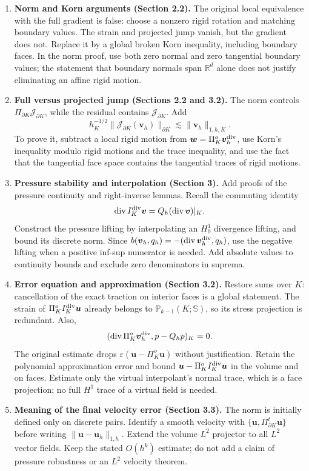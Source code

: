 \documentclass[10pt]{article}
\newcommand{\eps}{\varepsilon}
\begin{document}
\begin{enumerate}
\item \textbf{Norm and Korn arguments (Section 2.2).}
The original local equivalence with the full gradient is false: choose a
nonzero rigid rotation and matching boundary values. The strain and projected
jump vanish, but the gradient does not. Replace it by a global broken Korn
inequality, including boundary faces. In the norm proof, use both zero normal
and zero tangential boundary values; the statement that boundary normals span
$\mathbb R^d$ alone does not justify eliminating an affine rigid motion.

\item \textbf{Full versus projected jump (Sections 2.2 and 3.2).}
The norm controls $\Pi_{\partial K}\mathcal J_{\partial K}$, while the residual
contains $\mathcal J_{\partial K}$. Add
\[
h_K^{-1/2}\|\mathcal J_{\partial K}(\boldsymbol v_h)\|_{\partial K}
\lesssim\|\boldsymbol v_h\|_{1,h,K}.
\]
To prove it, subtract a local rigid motion from
$\boldsymbol w=\Pi_K^o\boldsymbol v_h^{\rm div}$, use Korn's inequality modulo
rigid motions and the trace inequality, and use the fact that the tangential
face space contains the tangential traces of rigid motions.

\item \textbf{Pressure stability and interpolation (Section 3).}
Add proofs of the pressure continuity and right-inverse lemmas. Recall the
commuting identity
\[
\operatorname{div}I_K^{\rm div}\boldsymbol v
=Q_h(\operatorname{div}\boldsymbol v)|_K.
\]
Construct the pressure lifting by interpolating an $H_0^1$ divergence lifting,
and bound its discrete norm. Since $b(\boldsymbol v_h,q_h)=
-(\operatorname{div}\boldsymbol v_h^{\rm div},q_h)$, use the negative lifting
when a positive inf-sup numerator is needed. Add absolute values to continuity
bounds and exclude zero denominators in suprema.

\item \textbf{Error equation and approximation (Section 3.2).}
Restore sums over $K$: cancellation of the exact traction on interior faces is
a global statement. The strain of $\Pi_K^o I_K^{\rm div}\boldsymbol u$ already
belongs to $\mathbb P_{k-1}(K;\mathbb S)$, so its stress projection is redundant.
Also,
\[
(\operatorname{div}\Pi_K^o\boldsymbol v_h^{\rm div},p-Q_hp)_K=0.
\]
The original estimate drops $\eps(\boldsymbol u-\Pi_K^o\boldsymbol u)$ without
justification. Retain the polynomial approximation error and bound
$\boldsymbol u-\Pi_K^o I_K^{\rm div}\boldsymbol u$ in the volume and on faces.
Estimate only the virtual interpolant's normal trace, which is a face
projection; no full $H^1$ trace of a virtual field is needed.

\item \textbf{Meaning of the final velocity error (Section 3.3).}
The norm is initially defined only on discrete pairs. Identify a smooth velocity
with $\{\boldsymbol u,\Pi_{\partial K}^t\boldsymbol u\}$ before writing
$\|\boldsymbol u-\boldsymbol u_h\|_{1,h}$. Extend the volume $L^2$ projector
to all $L^2$ vector fields. Keep the stated $O(h^k)$ estimate; do not add a claim
of pressure robustness or an $L^2$ velocity theorem.
\end{enumerate}
\end{document}
